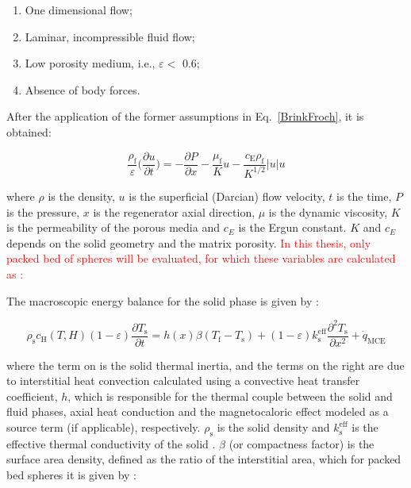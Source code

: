 \documentclass[review,preprint,12pt]{elsarticle}
\begin{document}
\begin{enumerate}
\item  One dimensional flow;
\item  Laminar, incompressible fluid flow;
\item  Low porosity medium, i.e., $\varepsilon <$ 0.6;
\item  Absence of body forces.
\end{enumerate}

After the application of the former assumptions in Eq.~\eqref{BrinkFroch}, it is obtained:

\begin{equation}
\frac{\rho_\textrm{f}}{\varepsilon}\Biggl(\frac{\partial u}{\partial t}\Biggr) = -\frac{\partial P}{\partial x} - \frac{\mu_\textrm{f}}{K}u - \frac{c_\textrm{E}\rho_\textrm{f}}{K^{1/2}}|u|u
\label{BrinkFrochSimplified}
\end{equation}

\noindent where $\rho$ is the density, $u$ is the superficial (Darcian) flow velocity, $t$ is the time, $P$ is the pressure, $x$ is the regenerator axial direction, $\mu$ is the dynamic viscosity, $K$ is the permeability of the porous media and $c_{E}$ is the Ergun constant. $K$ and $c_{E}$ depends on the solid geometry and the matrix  porosity. \textcolor{red}{In this thesis, only packed bed of spheres will be evaluated, for which these variables are calculated as \cite{Ergun1952}:}


The macroscopic energy balance for the solid phase is given by \cite{Engelbrecht2004,Trevizoli2015}:

\begin{equation}
\rho_\textrm{s} c_\textrm{H}(T,H)(1-\varepsilon)\frac{\partial T_\textrm{s}}{\partial t} = h(x) \beta (T_\textrm{f}-T_\textrm{s}) + (1-\varepsilon)k^\textrm{eff}_\textrm{s}\frac{\partial^{2} T_\textrm{s}}{\partial x^{2}} + \dot{q}_\textrm{MCE}
\label{SolidEnergyEquation}
\end{equation}

\noindent where the term on is the solid thermal inertia, and the terms on the right are due to interstitial heat convection calculated using a convective heat transfer coefficient, $h$, which is responsible for the thermal couple between the solid and fluid phases, axial heat conduction and the magnetocaloric effect modeled as a source term (if applicable), respectively. $\rho_\textrm{s}$ is the solid density and $k^\textrm{eff}_\textrm{s}$ is the effective thermal conductivity of the solid \cite{Kaviany1995,Nield2006}. $\beta$ (or compactness factor) is the surface area density, defined as the ratio of the interstitial area, which for packed bed spheres it is given by \cite{Kaviany1995}:
\end{document}
